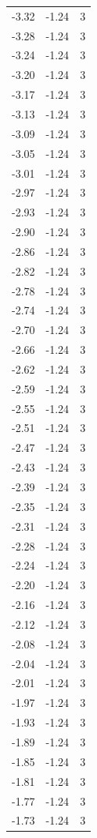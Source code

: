 \begin{longtable}{lrr}
  -3.32 & -1.24 & 3 \\
  -3.28 & -1.24 & 3 \\
  -3.24 & -1.24 & 3 \\
  -3.20 & -1.24 & 3 \\
  -3.17 & -1.24 & 3 \\
  -3.13 & -1.24 & 3 \\
  -3.09 & -1.24 & 3 \\
  -3.05 & -1.24 & 3 \\
  -3.01 & -1.24 & 3 \\
  -2.97 & -1.24 & 3 \\
  -2.93 & -1.24 & 3 \\
  -2.90 & -1.24 & 3 \\
  -2.86 & -1.24 & 3 \\
  -2.82 & -1.24 & 3 \\
  -2.78 & -1.24 & 3 \\
  -2.74 & -1.24 & 3 \\
  -2.70 & -1.24 & 3 \\
  -2.66 & -1.24 & 3 \\
  -2.62 & -1.24 & 3 \\
  -2.59 & -1.24 & 3 \\
  -2.55 & -1.24 & 3 \\
  -2.51 & -1.24 & 3 \\
  -2.47 & -1.24 & 3 \\
  -2.43 & -1.24 & 3 \\
  -2.39 & -1.24 & 3 \\
  -2.35 & -1.24 & 3 \\
  -2.31 & -1.24 & 3 \\
  -2.28 & -1.24 & 3 \\
  -2.24 & -1.24 & 3 \\
  -2.20 & -1.24 & 3 \\
  -2.16 & -1.24 & 3 \\
  -2.12 & -1.24 & 3 \\
  -2.08 & -1.24 & 3 \\
  -2.04 & -1.24 & 3 \\
  -2.01 & -1.24 & 3 \\
  -1.97 & -1.24 & 3 \\
  -1.93 & -1.24 & 3 \\
  -1.89 & -1.24 & 3 \\
  -1.85 & -1.24 & 3 \\
  -1.81 & -1.24 & 3 \\
  -1.77 & -1.24 & 3 \\
  -1.73 & -1.24 & 3 \\

\end{longtable}
